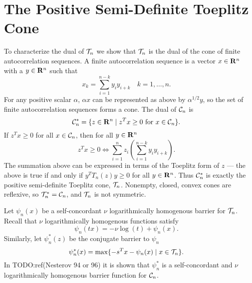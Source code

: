 \documentclass{article}
\begin{document}
\section{The Positive Semi-Definite Toeplitz Cone}

To characterize the dual of $\mathcal{T}_n$ we show that $\mathcal{T}_n$ is the dual of the 
cone of finite autocorrelation sequences. A finite autocorrelation sequence is a vector
$x \in \mathbf{R}^n$ with a $y \in \mathbf{R}^n$ such that 
\[
  x_k = \sum_{i=1}^{n-k} y_iy_{i+k} \quad k=1,\ldots,n.
\] 
For any positive scalar $\alpha$, $\alpha x$ can be represented as above 
by $\alpha^{1/2}y$, so the set of finite autocorrelation sequences forms a cone.
The dual of $\mathcal{C}_n$ is 
\[
  \mathcal{C}^*_n = \{z \in \mathbf{R}^n \mid z^Tx \geq 0 \text{ for } x \in \mathcal{C}_n\}.
\]
If $z^Tx \geq 0$ for all $x \in \mathcal{C}_n$, then for all
$y \in \mathbf{R}^n$ 
\[
  z^Tx \geq 0 \iff \sum_{i=1}^n z_i \left(\sum_{i=1}^{n-k} y_iy_{i+k}\right).
\]
The summation above can be expressed in terms of the Toeplitz form of $z$ ---
the above is true if and only if $y^TT_n(z)y \geq 0$ for all $y \in \mathbf{R}^n$. Thus
$\mathcal{C}^*_n$ is exactly the positive semi-definite Toeplitz cone, $\mathcal{T}_n$. Nonempty,
closed, convex cones are reflexive, so $\mathcal{T}_n^* = \mathcal{C}_n$, and $\mathcal{T}_n$ is not
symmetric.


Let $\psi_n(x)$ be a self-concordant $\nu$ logarithmically homogenous barrier for $\mathcal{T}_n$.
Recall that $\nu$ logarithmically homogenous functions satisfy
\[
  \psi_n(tx) = -\nu \log(t) + \psi_n(x).
\]
Similarly, let $\psi^*_n(z)$ be the conjugate barrier to $\psi_n$
\[
  \psi^*_n(x) = \max\{-s^Tx- \psi_n(x) \mid x \in \mathcal{T}_n\}.
\]
In TODO:ref(Nesterov 94 or 96) it is shown that $\psi^*_n$ is a self-concordant and $\nu$ logarithmically homogenous barrier function for
$\mathcal{C}_n$. 
\end{document}

